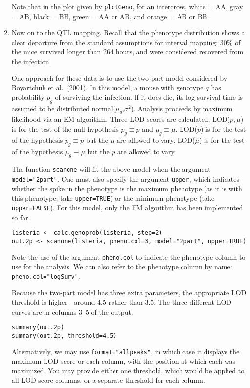 \documentclass[10pt,letterpaper]{article}
\newcommand{\usercolor}{\color [named]{BlueViolet}}
\begin{document}
\begin{enumerate}
Note that in the plot given by \verb-plotGeno-, for an intercross,
white = AA, gray = AB, black = BB, green = AA or AB, and orange = AB
or BB.

\item Now on to the QTL mapping.  Recall that the phenotype
distribution shows a clear departure from the standard assumptions for
interval mapping; 30\% of the mice survived longer than 264 hours, and
were considered recovered from the infection.

One approach for these data is to use the two-part model considered by
Boyartchuk et al.\ (2001).  In this model, a mouse with genotype $g$
has probability $p_g$ of surviving the infection.  If it does die, its
log survival time is assumed to be distributed
normal($\mu_g$,$\sigma^2$).  Analysis proceeds by maximum likelihood
via an EM algorithm.  Three LOD scores are calculated.  LOD($p,\mu$)
is for the test of the null hypothesis $p_g \equiv p$ and $\mu_g
\equiv \mu$.  LOD($p$) is for the test of the hypothesis $p_g \equiv
p$ but the $\mu$ are allowed to vary.  LOD($\mu$) is for the test of
the hypothesis $\mu_g \equiv \mu$ but the $p$ are allowed to vary.

The function \verb-scanone- will fit the above model when the argument
\verb-model="2part"-.  One must also specify the argument
\verb-upper-, which indicates whether the spike in the phenotype is
the maximum phenotype (as it is with this phenotype; take
\verb-upper=TRUE-) or the minimum phenotype (take \verb-upper=FALSE-).
For this model, only the EM algorithm has been implemented so far.

\usercolor
\verb|listeria <- calc.genoprob(listeria, step=2)| \\
\verb|out.2p <- scanone(listeria, pheno.col=3, model="2part", upper=TRUE)|
\normalcolor

Note the use of the argument \verb-pheno.col- to indicate the
phenotype column to use for the analysis.  We can also refer to the
phenotype column by name: \verb-pheno.col="logSurv"-.

Because the two-part model has three extra parameters, the
appropriate LOD threshold is higher---around 4.5 rather than 3.5.  The
three different LOD curves are in columns 3--5 of the output.  

\usercolor
\verb|summary(out.2p)| \\
\verb|summary(out.2p, threshold=4.5)| 
\normalcolor

Alternatively, we may use \verb-format="allpeaks"-, in which case it
displays the maximum LOD score or each column, with the position at
which each was maximized.  You may provide either one threshold, which
would be applied to all LOD score columns, or a separate threshold for
each column.


\end{enumerate}
\end{document}
